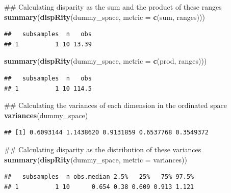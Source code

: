 \documentclass[]{book}
\newenvironment{Shaded}{\begin{snugshade}}{\end{snugshade}}
\newcommand{\KeywordTok}[1]{\textcolor[rgb]{0.13,0.29,0.53}{\textbf{#1}}}
\newcommand{\DataTypeTok}[1]{\textcolor[rgb]{0.13,0.29,0.53}{#1}}
\newcommand{\NormalTok}[1]{#1}
\theoremstyle{definition}
\theoremstyle{definition}
\theoremstyle{remark}
\begin{document}
\begin{Shaded}
\begin{Highlighting}[]
\NormalTok{## Calculating disparity as the sum and the product of these ranges}
\KeywordTok{summary}\NormalTok{(}\KeywordTok{dispRity}\NormalTok{(dummy_space, }\DataTypeTok{metric =} \KeywordTok{c}\NormalTok{(sum, ranges)))}
\end{Highlighting}
\end{Shaded}

\begin{verbatim}
##   subsamples  n   obs
## 1          1 10 13.39
\end{verbatim}

\begin{Shaded}
\begin{Highlighting}[]
\KeywordTok{summary}\NormalTok{(}\KeywordTok{dispRity}\NormalTok{(dummy_space, }\DataTypeTok{metric =} \KeywordTok{c}\NormalTok{(prod, ranges)))}
\end{Highlighting}
\end{Shaded}

\begin{verbatim}
##   subsamples  n   obs
## 1          1 10 114.5
\end{verbatim}

\begin{Shaded}
\begin{Highlighting}[]
\NormalTok{## Calculating the variances of each dimension in the ordinated space}
\KeywordTok{variances}\NormalTok{(dummy_space)}
\end{Highlighting}
\end{Shaded}

\begin{verbatim}
## [1] 0.6093144 1.1438620 0.9131859 0.6537768 0.3549372
\end{verbatim}

\begin{Shaded}
\begin{Highlighting}[]
\NormalTok{## Calculating disparity as the distribution of these variances}
\KeywordTok{summary}\NormalTok{(}\KeywordTok{dispRity}\NormalTok{(dummy_space, }\DataTypeTok{metric =}\NormalTok{ variances))}
\end{Highlighting}
\end{Shaded}

\begin{verbatim}
##   subsamples  n obs.median 2.5%   25%   75% 97.5%
## 1          1 10      0.654 0.38 0.609 0.913 1.121
\end{verbatim}
\end{document}
